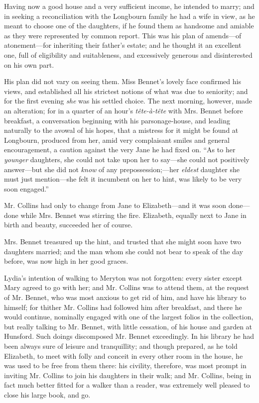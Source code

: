 \documentclass[12pt]{book}
\begin{document}
Having now a good house and a very sufficient income, he intended to marry; and in seeking a reconciliation with the Longbourn family he had a wife in view, as he meant to choose one of the daughters, if he found them as handsome and amiable as they were represented by common report. This was his plan of amends---of atonement---for inheriting their father's estate; and he thought it an excellent one, full of eligibility and suitableness, and excessively generous and disinterested on his own part.

His plan did not vary on seeing them. Miss Bennet's lovely face confirmed his views, and established all his strictest notions of what was due to seniority; and for the first evening \textit{she} was his settled choice. The next morning, however, made an alteration; for in a quarter of an hour's \textit{tête-à-tête} with Mrs. Bennet before breakfast, a conversation beginning with his parsonage-house, and leading naturally to the avowal of his hopes, that a mistress for it might be found at Longbourn, produced from her, amid very complaisant smiles and general encouragement, a caution against the very Jane he had fixed on. ``As to her \textit{younger} daughters, she could not take upon her to say---she could not positively answer---but she did not \textit{know} of any prepossession;---her \textit{eldest} daughter she must just mention---she felt it incumbent on her to hint, was likely to be very soon engaged.''

Mr. Collins had only to change from Jane to Elizabeth---and it was soon done---done while Mrs. Bennet was stirring the fire. Elizabeth, equally next to Jane in birth and beauty, succeeded her of course.

Mrs. Bennet treasured up the hint, and trusted that she might soon have two daughters married; and the man whom she could not bear to speak of the day before, was now high in her good graces.

Lydia's intention of walking to Meryton was not forgotten: every sister except Mary agreed to go with her; and Mr. Collins was to attend them, at the request of Mr. Bennet, who was most anxious to get rid of him, and have his library to himself; for thither Mr. Collins had followed him after breakfast, and there he would continue, nominally engaged with one of the largest folios in the collection, but really talking to Mr. Bennet, with little cessation, of his house and garden at Hunsford. Such doings discomposed Mr. Bennet exceedingly. In his library he had been always sure of leisure and tranquillity; and though prepared, as he told Elizabeth, to meet with folly and conceit in every other room in the house, he was used to be free from them there: his civility, therefore, was most prompt in inviting Mr. Collins to join his daughters in their walk; and Mr. Collins, being in fact much better fitted for a walker than a reader, was extremely well pleased to close his large book, and go.
\end{document}
